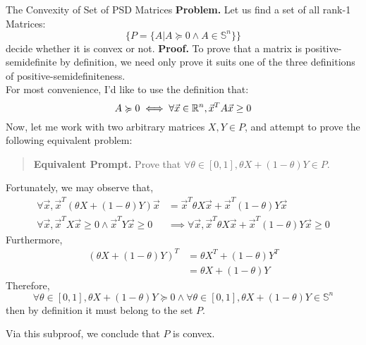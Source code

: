 \begin{ln-explain}{The Convexity of Set of PSD Matrices}{}
    \textbf{Problem.} Let us find a set of all rank-1 Matrices:
    \[
        \{P = \{ A | A \succcurlyeq 0 \land A \in \mathbb{S}^n \}\}
    \]
    decide whether it is convex or not.
    \tcblower
    \textbf{Proof.}
    To prove that a matrix is positive-semidefinite by definition, we need only prove it suits one of the three definitions of positive-semidefiniteness. \\
    For most convenience, I'd like to use the definition that:
    \[
        A \succcurlyeq 0 \iff \forall \vec{x} \in \mathbb{R}^n, \vec{x}^T A \vec{x} \geq 0
    \]
    Now, let me work with two arbitrary matrices $X, Y \in P$, and attempt to prove the following equivalent problem:
    \begin{quote}
        \textbf{Equivalent Prompt.} Prove that $\forall \theta \in [0, 1], \theta X + (1 - \theta) Y \in P$.
    \end{quote}
    Fortunately, we may observe that,
    \begin{align*}
        \forall \vec{x}, \vec{x}^T (\theta X + (1 - \theta) Y) \vec{x}
        &= \vec{x}^T \theta X \vec{x} + \vec{x}^T (1 - \theta) Y \vec{x} \\
        \forall \vec{x}, \vec{x}^T X \vec{x} \geq 0 \land \vec{x}^T Y \vec{x} \geq 0 &\implies \forall \vec{x}, \vec{x}^T \theta X \vec{x} + \vec{x}^T (1 - \theta) Y \vec{x} \geq 0
    \end{align*}
    Furthermore, 
    \begin{align*}
        {(\theta X + (1 - \theta) Y)}^T &= \theta X^T + (1 - \theta) Y^T \\
        &= \theta X + (1 - \theta) Y
    \end{align*}
    Therefore,
    \[
        \forall \theta \in [0, 1], \theta X + (1 - \theta) Y \succcurlyeq 0 \land \forall \theta \in [0, 1], \theta X + (1 - \theta) Y \in \mathbb{S}^n
    \]
    then by definition it must belong to the set $P$.
    \par
    Via this subproof, we conclude that $P$ is convex.
\end{ln-explain}


